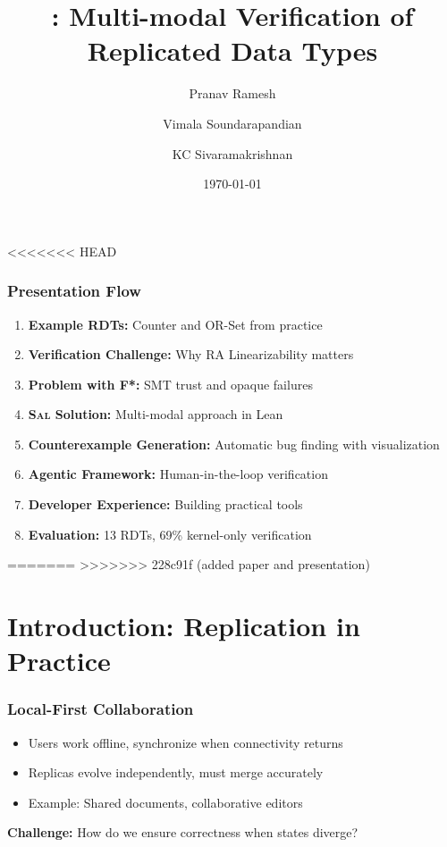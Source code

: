 \documentclass[usepdftitle=false]{beamer}
\title[\sal: Multi-modal Verification]{
  \sal: Multi-modal Verification of Replicated Data Types
}
\author{Pranav Ramesh \and Vimala Soundarapandian \and KC Sivaramakrishnan}
\institute{
  Indian Institute of Technology, Madras
}
\date{\today}
\newcommand{\sal}{\textsc{Sal}\xspace}
\begin{document}
\begin{frame}
  \titlepage
\end{frame}

<<<<<<< HEAD
\begin{frame}
  \frametitle{Presentation Flow}
  \begin{enumerate}
    \setlength\itemsep{0.5cm}
    \item \textbf{Example RDTs:} Counter and OR-Set from practice
    \item \textbf{Verification Challenge:} Why RA Linearizability matters
    \item \textbf{Problem with F*:} SMT trust and opaque failures
    \item \textbf{\sal Solution:} Multi-modal approach in Lean
    \item \textbf{Counterexample Generation:} Automatic bug finding with visualization
    \item \textbf{Agentic Framework:} Human-in-the-loop verification
    \item \textbf{Developer Experience:} Building practical tools
    \item \textbf{Evaluation:} 13 RDTs, 69\% kernel-only verification
  \end{enumerate}
\end{frame}

=======
>>>>>>> 228c91f (added paper and presentation)
\section{Introduction: Replication in Practice}

\begin{frame}
  \frametitle{Local-First Collaboration}
  \begin{itemize}
    \item Users work offline, synchronize when connectivity returns
    \item Replicas evolve independently, must merge accurately
    \item Example: Shared documents, collaborative editors
  \end{itemize}
  \vspace{0.5cm}
  
  \textbf{Challenge:} How do we ensure correctness when states diverge?
\end{frame}
\end{document}
